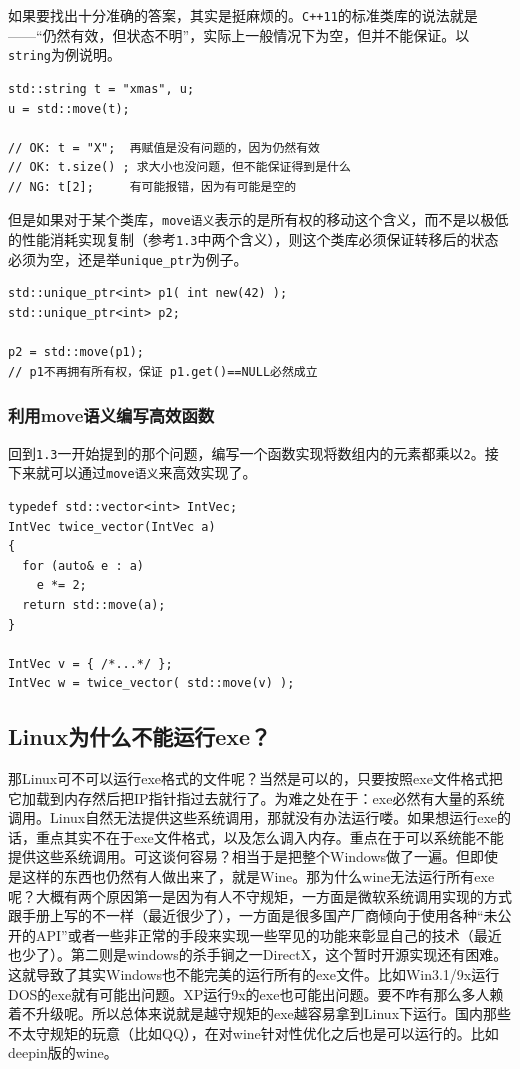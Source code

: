 如果要找出十分准确的答案，其实是挺麻烦的。\texttt{C++11}的标准类库的说法就是------``仍然有效，但状态不明''，实际上一般情况下为空，但并不能保证。以\texttt{string}为例说明。

\begin{lstlisting}
std::string t = "xmas", u;
u = std::move(t);

// OK: t = "X";  再赋值是没有问题的，因为仍然有效
// OK: t.size() ; 求大小也没问题，但不能保证得到是什么
// NG: t[2];     有可能报错，因为有可能是空的
\end{lstlisting}

但是如果对于某个类库，\texttt{move语义}表示的是所有权的移动这个含义，而不是以极低的性能消耗实现复制（参考\texttt{1.3}中两个含义），则这个类库必须保证转移后的状态必须为空，还是举\texttt{unique\_ptr}为例子。

\begin{lstlisting}
std::unique_ptr<int> p1( int new(42) );
std::unique_ptr<int> p2;

p2 = std::move(p1); 
// p1不再拥有所有权，保证 p1.get()==NULL必然成立
\end{lstlisting}

\subsubsection[利用move语义编写高效函数]{\texorpdfstring{\protect\hypertarget{23move_115}{}{}利用move语义编写高效函数}{2.3利用move语义编写高效函数}}\label{ux5229ux7528moveux8bedux4e49ux7f16ux5199ux9ad8ux6548ux51fdux6570}

回到\texttt{1.3}一开始提到的那个问题，编写一个函数实现将数组内的元素都乘以\texttt{2}。接下来就可以通过\texttt{move语义}来高效实现了。

\begin{lstlisting}
typedef std::vector<int> IntVec;
IntVec twice_vector(IntVec a)
{
  for (auto& e : a)
    e *= 2;
  return std::move(a); 
}

IntVec v = { /*...*/ };
IntVec w = twice_vector( std::move(v) );
\end{lstlisting}
\subsection{Linux为什么不能运行exe？}
那Linux可不可以运行exe格式的文件呢？当然是可以的，只要按照exe文件格式把它加载到内存然后把IP指针指过去就行了。为难之处在于：exe必然有大量的系统调用。Linux自然无法提供这些系统调用，那就没有办法运行喽。如果想运行exe的话，重点其实不在于exe文件格式，以及怎么调入内存。重点在于可以系统能不能提供这些系统调用。可这谈何容易？相当于是把整个Windows做了一遍。但即使是这样的东西也仍然有人做出来了，就是Wine。那为什么wine无法运行所有exe呢？大概有两个原因第一是因为有人不守规矩，一方面是微软系统调用实现的方式跟手册上写的不一样（最近很少了），一方面是很多国产厂商倾向于使用各种“未公开的API”或者一些非正常的手段来实现一些罕见的功能来彰显自己的技术（最近也少了）。第二则是windows的杀手锏之一DirectX，这个暂时开源实现还有困难。这就导致了其实Windows也不能完美的运行所有的exe文件。比如Win3.1/9x运行DOS的exe就有可能出问题。XP运行9x的exe也可能出问题。要不咋有那么多人赖着不升级呢。所以总体来说就是越守规矩的exe越容易拿到Linux下运行。国内那些不太守规矩的玩意（比如QQ），在对wine针对性优化之后也是可以运行的。比如deepin版的wine。
